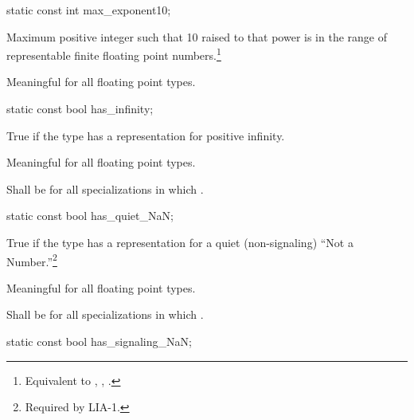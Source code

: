 \begin{itemdecl}
static const int  max_exponent10;
\end{itemdecl}

\begin{itemdescr}
\pnum
Maximum positive integer such that 10 raised to that power is in the
range of representable finite floating point numbers.\footnote{Equivalent to
, , .}

\pnum
Meaningful for all floating point types.
\end{itemdescr}

\begin{itemdecl}
static const bool has_infinity;
\end{itemdecl}

\begin{itemdescr}
\pnum
True if the type has a representation for positive infinity.

\pnum
Meaningful for all floating point types.

\pnum
Shall be
for all specializations in which
.
\end{itemdescr}

\begin{itemdecl}
static const bool has_quiet_NaN;
\end{itemdecl}

\begin{itemdescr}
\pnum
True if the type has a representation for a quiet (non-signaling) ``Not a
Number.''\footnote{Required by LIA-1.}

\pnum
Meaningful for all floating point types.

\pnum
Shall be
for all specializations in which
.
\end{itemdescr}

\begin{itemdecl}
static const bool has_signaling_NaN;
\end{itemdecl}

